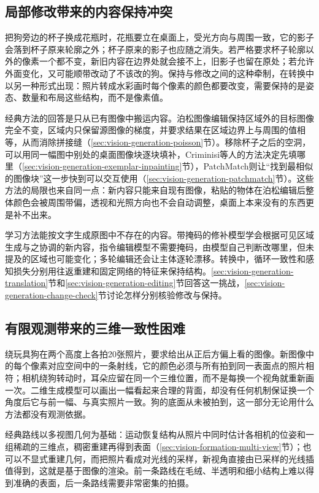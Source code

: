 \subsection{局部修改带来的内容保持冲突}
\label{sec:vision-generation-challenge-preservation}

把狗旁边的杯子换成花瓶时，花瓶要立在桌面上，受光方向与周围一致，它的影子会落到杯子原来轮廓之外；杯子原来的影子也应随之消失。若严格要求杯子轮廓以外的像素一个都不变，新旧内容在边界处就会接不上，旧影子也留在原处；若允许外面变化，又可能顺带改动了不该改的狗。保持与修改之间的这种牵制，在转换中以另一种形式出现：照片转成水彩画时每个像素的颜色都要改变，需要保持的是姿态、数量和布局这些结构，而不是像素值。

经典方法的回答是只从已有图像中搬运内容。泊松图像编辑保持区域外的目标图像完全不变，区域内只保留源图像的梯度，并要求结果在区域边界上与周围的值相等，从而消除拼接缝（\ref{sec:vision-generation-poisson}节）。移除杯子之后的空洞，可以用同一幅图中别处的桌面图像块逐块填补，Criminisi等人的方法决定先填哪里（\ref{sec:vision-generation-exemplar-inpainting}节），PatchMatch则让“找到最相似的图像块”这一步快到可以交互使用（\ref{sec:vision-generation-patchmatch}节）。这些方法的局限也来自同一点：新内容只能来自现有图像，粘贴的物体在泊松编辑后整体颜色会被周围带偏，透视和光照方向也不会自动调整，桌面上本来没有的东西更是补不出来。

学习方法能按文字生成原图中不存在的内容。带掩码的修补模型学会根据可见区域生成与之协调的新内容，指令编辑模型不需要掩码，由模型自己判断改哪里，但未提及的区域也可能变化；多轮编辑还会让主体逐轮漂移。转换中，循环一致性和感知损失分别用往返重建和固定网络的特征来保持结构。\ref{sec:vision-generation-translation}节和\ref{sec:vision-generation-editing}节回答这一挑战，\ref{sec:vision-generation-change-check}节讨论怎样分别核验修改与保持。

\subsection{有限观测带来的三维一致性困难}
\label{sec:vision-generation-challenge-3d}

绕玩具狗在两个高度上各拍20张照片，要求给出从正后方偏上看的图像。新图像中的每个像素对应空间中的一条射线，它的颜色必须与所有拍到同一表面点的照片相符；相机绕狗转动时，耳朵应留在同一个三维位置，而不是每换一个视角就重新画一次。二维生成模型可以画出一幅看起来合理的背面，却没有任何机制保证换一个角度后它与前一幅、与真实照片一致。狗的底面从未被拍到，这一部分无论用什么方法都没有观测依据。

经典路线以多视图几何为基础：运动恢复结构从照片中同时估计各相机的位姿和一组稀疏的三维点，稠密重建再得到表面（\ref{sec:vision-formation-multi-view}节）；也可以不显式重建几何，而把照片看成对光线的采样，新视角直接由已采样的光线插值得到，这就是基于图像的渲染。前一条路线在毛绒、半透明和细小结构上难以得到准确的表面，后一条路线需要非常密集的拍摄。

